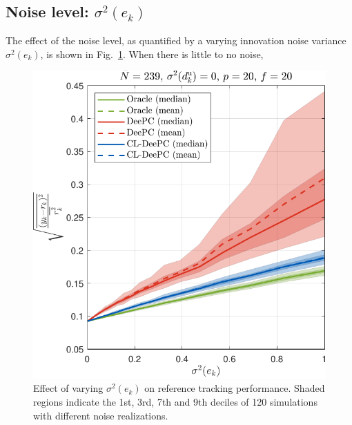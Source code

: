 \subsection{Noise level: $\sigma^2(e_k)$}
The effect of the noise level, as quantified by a varying innovation noise variance $\sigma^2(e_k)$, is shown in Fig.~\ref{fig:varying_Re}. When there is little to no noise, 
\begin{figure}[b!]
\begin{center}
\includegraphics[width=\columnwidth]{results/figures/Varying_Re_0.0001-1-50_Nbar_239_p_20_f_20_Ru_1_Rdu_0_Q_100_R_0_dR_10.pdf}    %
\caption{Effect of varying $\sigma^2(e_k)$ on reference tracking performance. Shaded regions indicate the 1st, 3rd, 7th and 9th deciles of 120 simulations with different noise realizations.}  %
\label{fig:varying_Re}                                 %
\end{center}                                 %
\end{figure}

